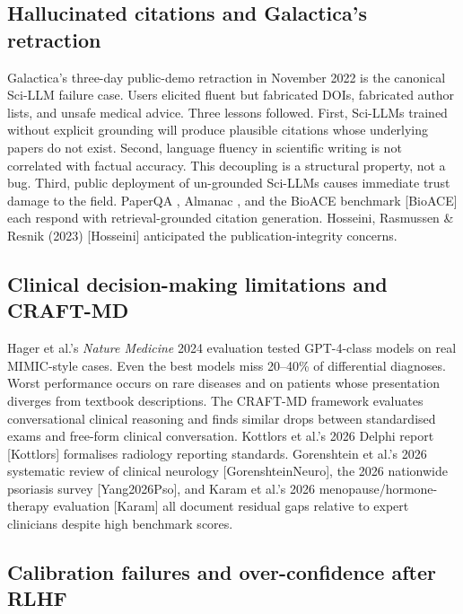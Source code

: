 \documentclass{article}
\begin{document}
\subsection{Hallucinated citations and Galactica's retraction}\label{hallucinated-citations-and-galacticas-retraction}

Galactica's three-day public-demo retraction in November 2022 \cite{taylor2022arxiv2211090852022} is the canonical Sci-LLM failure case. Users elicited fluent but fabricated DOIs, fabricated author lists, and unsafe medical advice. Three lessons followed. First, Sci-LLMs trained without explicit grounding will produce plausible citations whose underlying papers do not exist. Second, language fluency in scientific writing is not correlated with factual accuracy. This decoupling is a structural property, not a bug. Third, public deployment of un-grounded Sci-LLMs causes immediate trust damage to the field. PaperQA \cite{ala2023arxiv2312075592023}, Almanac \cite{zakka2024almanacretrievalau}, and the BioACE benchmark {[}BioACE{]} each respond with retrieval-grounded citation generation. Hosseini, Rasmussen \& Resnik (2023) {[}Hosseini{]} anticipated the publication-integrity concerns.

\subsection{Clinical decision-making limitations and CRAFT-MD}\label{clinical-decision-making-limitations-and-craft-md}

Hager et al.'s \emph{Nature Medicine} 2024 evaluation \cite{hager2024evaluationandmitig} tested GPT-4-class models on real MIMIC-style cases. Even the best models miss 20--40\% of differential diagnoses. Worst performance occurs on rare diseases and on patients whose presentation diverges from textbook descriptions. The CRAFT-MD framework evaluates conversational clinical reasoning and finds similar drops between standardised exams and free-form clinical conversation. Kottlors et al.'s 2026 Delphi report {[}Kottlors{]} formalises radiology reporting standards. Gorenshtein et al.'s 2026 systematic review of clinical neurology {[}GorenshteinNeuro{]}, the 2026 nationwide psoriasis survey {[}Yang2026Pso{]}, and Karam et al.'s 2026 menopause/hormone-therapy evaluation {[}Karam{]} all document residual gaps relative to expert clinicians despite high benchmark scores.

\subsection{Calibration failures and over-confidence after RLHF}\label{calibration-failures-and-over-confidence-after-rlhf}
\end{document}
